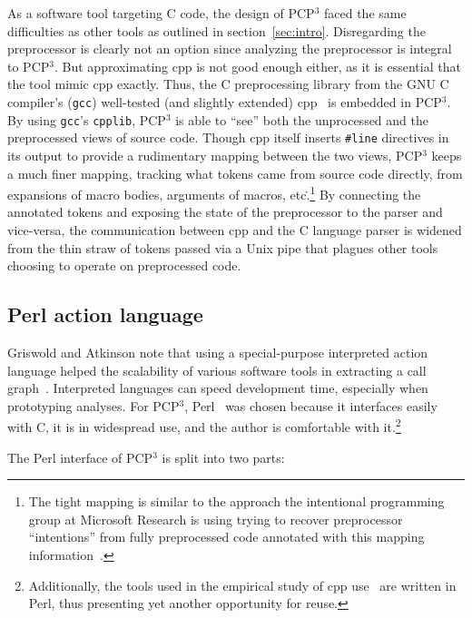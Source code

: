 \documentclass{article}
\newcommand{\pcp}{\mbox{\textsf{PCP}$^3$}}
\newcommand{\Cpp}{\mbox{\textsf{cpp}}}
\newcommand{\Perl}{\mbox{\textsf{Perl}}}
\newcommand{\C}{\mbox{\textsf{C}}}
\newcommand{\ppd}[1]{\texttt{\##1}}
\newcommand{\etc}{etc\.}
\begin{document}
As a software tool targeting \C{} code, the design of \pcp{} faced the
same difficulties as other tools as outlined in section~\ref{sec:intro}.
Disregarding the preprocessor is clearly not an option since analyzing
the preprocessor is integral to \pcp{}.  But approximating \Cpp{} is not
good enough either, as it is essential that the tool mimic \Cpp{}
exactly. Thus, the \C{} preprocessing library from the GNU \C{}
compiler's (\texttt{gcc}) well-tested (and slightly extended)
\Cpp{}~\cite{GCC} is embedded in \pcp{}.  By using \texttt{gcc}'s
\texttt{cpplib}, \pcp{} is able to ``see'' both the unprocessed and
the preprocessed views of source code.  Though \Cpp{} itself inserts
\ppd{line} directives in its output to provide a rudimentary mapping
between the two views, \pcp{} keeps a much finer mapping, tracking
what tokens came from source code directly, from expansions of macro
bodies, arguments of macros, \etc.\footnote{The tight mapping is similar
  to the approach the intentional programming group at Microsoft
  Research is using trying to recover preprocessor ``intentions'' from
  fully preprocessed code annotated with this mapping
  information~\cite{MSIPPersonal}.}  By connecting the annotated tokens
and exposing the state of the preprocessor to the parser and vice-versa,
the communication between \Cpp{} and the \C{} language parser is widened
from the thin straw of tokens passed via a Unix pipe that plagues other
tools choosing to operate on preprocessed code.

\subsection{Perl action language}

Griswold and Atkinson note that using a special-purpose interpreted
action language helped the scalability of various software tools in
extracting a call graph~\cite{Griswold96}.  Interpreted languages can
speed development time, especially when prototyping analyses.  For
\pcp{}, \Perl{}~\cite{Perl,Camel} was chosen because it interfaces
easily with \C{}, it is in widespread use, and the author is comfortable
with it.\footnote{Additionally, the tools used in the empirical study of
  \Cpp{} use~\cite{EmpCpp-TR}  are written in \Perl{}, thus
  presenting yet another opportunity for reuse.}

The \Perl{} interface of \pcp{} is split into two parts:
\end{document}
